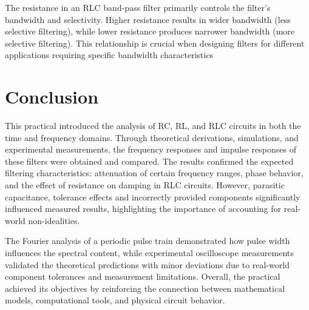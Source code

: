 \documentclass[a4paper, onecolumn, 12pt]{IEEEtran}
\begin{document}
The resistance in an RLC band-pass filter primarily controls the filter's bandwidth and selectivity. Higher resistance results in wider bandwidth (less selective filtering), while lower resistance produces narrower bandwidth (more selective filtering). This relationship is crucial when designing filters for different applications requiring specific bandwidth characteristics

\newpage

\section{Conclusion}
\label{sec:conclusion}
This practical introduced the analysis of RC, RL, and RLC circuits in both the time and frequency domains. Through theoretical derivations, simulations, and experimental measurements, the frequency responses and impulse responses of these filters were obtained and compared. The results confirmed the expected filtering characteristics: attenuation of certain frequency ranges, phase behavior, and the effect of resistance on damping in RLC circuits. However, parasitic capacitance, tolerance effects and incorrectly provided components significantly influenced measured results, highlighting the importance of accounting for real-world non-idealities.

The Fourier analysis of a periodic pulse train demonstrated how pulse width influences the spectral content, while experimental oscilloscope measurements validated the theoretical predictions with minor deviations due to real-world component tolerances and measurement limitations. Overall, the practical achieved its objectives by reinforcing the connection between mathematical models, computational tools, and physical circuit behavior.


\newpage


\IEEEtriggercmd{\normalsize}

%
%



\FloatBarrier


\newpage
\appendices


\end{document}
